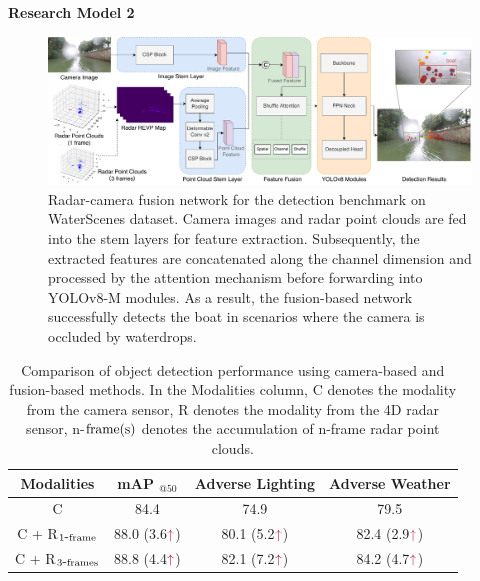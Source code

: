 \documentclass[final]{beamer}
\newlength{\colwidthB}
\begin{document}
\begin{frame}[t]
\begin{columns}
\begin{column}[T]{\colwidthB}
\begin{block}{\Large{\textbf{Research Model 2}}}
\begin{figure}
\includegraphics[width=1\textwidth]{images/network.pdf}
\caption{Radar-camera fusion network for the detection benchmark on WaterScenes dataset. Camera images and radar point clouds are fed into the stem layers for feature extraction. Subsequently, the extracted features are concatenated along the channel dimension and processed by the attention mechanism before forwarding into YOLOv8-M modules. As a result, the fusion-based network successfully detects the boat in scenarios where the camera is occluded by waterdrops.}
\end{figure}

\vspace{-0.7cm}
\begin{table}[!h]
\caption{Comparison of object detection performance using camera-based and fusion-based methods. In the Modalities column, C denotes the modality from the camera sensor, R denotes the modality from the 4D radar sensor, n-$\textup{frame(s)}$ denotes the accumulation of n-frame radar point clouds.}
\vspace{-0.5cm}
\setlength\tabcolsep{21pt}
\large
\begin{tabular}{c|ccc}
\toprule
\bf{Modalities} & \bf{mAP $_{@50}$} & \bf{Adverse Lighting} & \bf{Adverse Weather}\\\midrule
C & 84.4 & 74.9 & 79.5\\
C + R$_{1\mbox{-}\textup{frame}}$ & 88.0 (3.6$\color{purple}{\uparrow}$) & 80.1 (5.2$\color{purple}{\uparrow}$) & 82.4 (2.9$\color{purple}{\uparrow}$)\\
C + R$_{3\mbox{-}\textup{frames}}$ & 88.8 (4.4$\color{purple}{\uparrow}$) & 82.1 (7.2$\color{purple}{\uparrow}$) & 84.2 (4.7$\color{purple}{\uparrow}$)\\
\bottomrule
\end{tabular}
\end{table}


\end{block}
\end{column}
\end{columns}
\end{frame}
\end{document}

